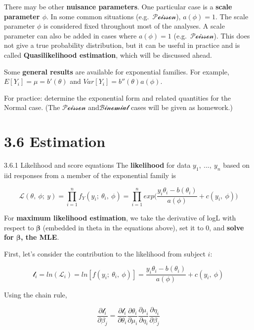 \documentclass[
  9pt,
  ignorenonframetext,
]{beamer}
\begin{document}
\begin{frame}{}
\protect\hypertarget{section-3}{}
There may be other \textbf{nuisance parameters}. One particular case is
a \textbf{scale parameter \(\phi\)}. In some common situations
(e.g.~\(\mathcal {Poisson}\)), \(a(\phi)=1\). The scale parameter
\(\phi\) is considered fixed throughout most of the analyses. A scale
parameter can also be added in cases where \(a(\phi)=1\)
(e.g.~\(\mathcal {Poisson}\)). This does not give a true probability
distribution, but it can be useful in practice and is called
\textbf{Quasilikelihood estimation}, which will be discussed ahead.

Some \textbf{general results} are available for exponential families.
For example, \(E[Y_i]=\mu=b' (\theta)\) and
\(Var[Y_i]=b''(\theta)a(\phi)\).

For practice: determine the exponential form and related quantities for
the Normal case. (The \(\mathcal {Poisson}\) and\(\mathcal {Binomial}\)
cases will be given as homework.)
\end{frame}

\hypertarget{estimation}{%
\section{3.6 Estimation}\label{estimation}}

\begin{frame}{3.6.1 Likelihood and score equations}
\protect\hypertarget{likelihood-and-score-equations}{}
The \textbf{likelihood} for data \(y_1,\ ...,\ y_n\) based on iid
responses from a member of the exponential family is

\[
\mathcal L(\theta,\ \phi;\ y) = \prod_{i=1}^n f_Y (y_i;\ \theta_i,\ \phi) =\prod_{i=1}^n exp  \Big( \frac {y_i \theta_i-b(\theta_i)} {a(\phi)}+c(y_i,\ \phi)\Big) 
\]

For \textbf{maximum likelihood estimation}, we take the derivative of
logL with respect to \(\pmb \beta\) (embedded in theta in the equations
above), set it to 0, and \textbf{solve for \(\pmb \beta\), the MLE}.

First, let's consider the contribution to the likelihood from subject
\(i\):

\[
\mathcal l_i= ln(\mathcal L_i)= ln[f(y_i;\ \theta_i,\ \phi)] = \frac {y_i \theta_i-b(\theta_i )} {a(\phi)} + c(y_i,\ \phi)
\]

Using the chain rule,

\[
\frac {\partial \mathcal l_i} {\partial\beta_j} = \frac {\partial \mathcal l_i} {\partial\theta_i } \frac {\partial\theta_i} {\partial\mu_i } \frac {\partial\mu_i} {\partial\eta_i } \frac {\partial\eta_i} {\partial\beta_j }
\]
\end{frame}
\end{document}
